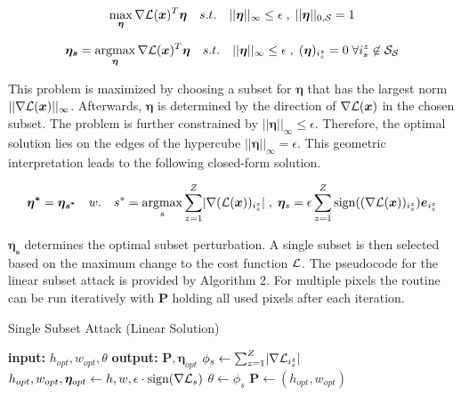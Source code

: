 \begin{equation}
\begin{aligned}
	\max_{\bm{\eta}} \nabla \mathcal{L}(\bm{x})^T \bm{\eta} \quad s.t. \quad \lvert\lvert \bm{\eta} \rvert\rvert_{\infty} \leq \epsilon \;, \; \lvert\lvert \bm{\eta} \rvert\rvert_{0, \mathcal{S}} = 1
\end{aligned}
\label{singlesubsetlinear}
\end{equation}

\begin{equation}
\begin{aligned}
	\bm{\eta_{s}} = \operatorname*{argmax}_{\bm{\eta}} \nabla \mathcal{L}(\bm{x})^T \bm{\eta} \quad s.t. \quad \lvert\lvert \bm{\eta} \rvert\rvert_{\infty} \leq \epsilon \;, \; (\bm{\eta})_{i_s^z} = 0 \; \forall i_s^z \not\in \mathcal{S}_{\mathcal{S}}
\end{aligned}
\label{singlesubsetrewrite}
\end{equation}

\begingroup
This problem is maximized by choosing a subset for $\bm{\eta}$ that has the largest norm $\lvert\lvert \nabla \mathcal{L}(\bm{x}) \rvert\rvert_{\infty} $.
Afterwards, $\bm{\eta}$ is determined by the direction of $\nabla \mathcal{L}(\bm{x})$ in the chosen subset. The problem is further constrained by
$\lvert\lvert \bm{\eta} \rvert\rvert_{\infty} \leq \epsilon$. Therefore, the optimal solution lies on the edges of
the hypercube $\lvert\lvert \bm{\eta} \rvert\rvert_{\infty} = \epsilon$. This geometric interpretation leads to the following closed-form solution.
\endgroup


\begin{equation}
\begin{aligned}
	\bm{\eta^{*}} = \bm{\eta_{s^*}} \quad w. \quad s^{*} = \operatorname*{argmax}_s \sum_{z=1}^{Z} \lvert \nabla (\mathcal{L}(\bm{x}))_{i^z_s} \rvert \; , \; \bm{\eta}_s = \epsilon \sum^{Z}_{z=1} \text{sign}((\nabla \mathcal{L}(\bm{x}))_{i_s^z}) \bm{e}_{i^z_s}
\end{aligned}
\label{singlelinearsolution}
\end{equation}

\begingroup
$\bm{\eta_s}$ determines the optimal subset perturbation. A single subset is then selected based on the maximum change to the cost function $\mathcal{L}$.
The pseudocode for the linear subset attack is provided by Algorithm 2. For multiple pixels the routine can be run iteratively with $\bm{P}$
holding all used pixels after each iteration.
\endgroup


\begin{algorithm}[ht]
\caption{Single Subset Attack (Linear Solution)}
\label{alg:single_linear}
\begin{algorithmic}[1]
\State \textbf{input:} $h_{opt}, w_{opt}, \theta$
\State \textbf{output:} $\bm{P}, \bm{\eta}_{opt}$
		\State $\phi_s \gets \sum_{z=1}^Z \lvert \nabla \mathcal{L}_{i_s^z} \rvert$
			\State $h_{opt}, w_{opt}, \bm{\eta}_{opt} \gets h, w, \epsilon \cdot \text{sign}(\nabla \mathcal{L}_s)$
			\State $\theta \gets \phi_s$
		\EndIf
	\EndFor
\EndFor
\State $\bm{P} \gets (h_{opt}, w_{opt})$
\end{algorithmic}
\end{algorithm}


